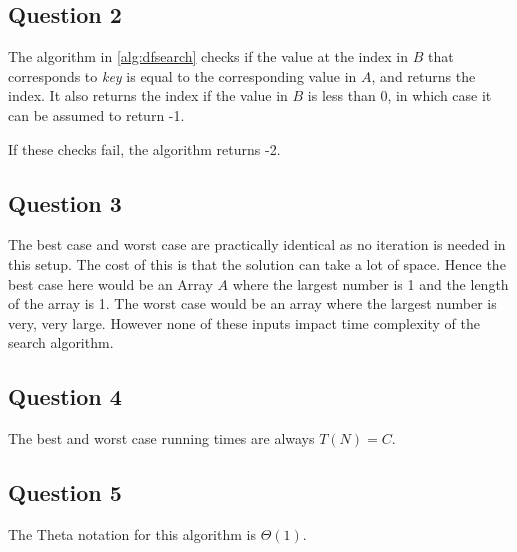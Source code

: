\subsection{Question 2}

The algorithm in \autoref{alg:dfsearch} checks if the value at the index in $B$ that corresponds to \textit{key} is equal to the corresponding value in $A$, and returns the index. It also returns the index if the value in $B$ is less than 0, in which case it can be assumed to return -1.

If these checks fail, the algorithm returns -2.

\subsection{Question 3}
The best case and worst case are practically identical as no iteration is needed in this setup. The cost of this is that the solution can take a lot of space. Hence the best case here would be an Array $A$ where the largest number is 1 and the length of the array is 1. The worst case would be an array where the largest number is very, very large. However none of these inputs impact time complexity of the search algorithm.

\subsection{Question 4}
The best and worst case running times are always $T(N) = C$.

\subsection{Question 5}
The Theta notation for this algorithm is $\Theta(1)$.



